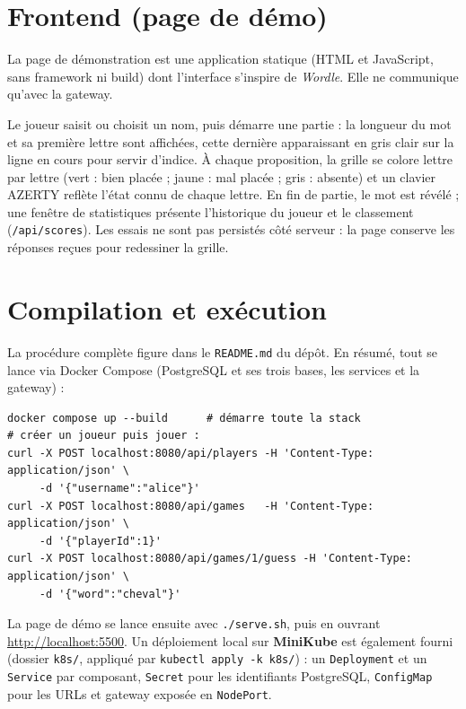\documentclass[11pt,a4paper]{article}
\begin{document}
\section{Frontend (page de démo)}
La page de démonstration est une application statique (HTML et JavaScript, sans
framework ni build) dont l'interface s'inspire de \textit{Wordle}. Elle ne communique
qu'avec la gateway.

Le joueur saisit ou choisit un nom, puis démarre une partie : la longueur du mot et sa
première lettre sont affichées, cette dernière apparaissant en gris clair sur la ligne
en cours pour servir d'indice. À chaque proposition, la grille se colore lettre par
lettre (vert : bien placée ; jaune : mal placée ; gris : absente) et un clavier AZERTY
reflète l'état connu de chaque lettre. En fin de partie, le mot est révélé ; une fenêtre
de statistiques présente l'historique du joueur et le classement (\texttt{/api/scores}).
Les essais ne sont pas persistés côté serveur : la page conserve les réponses reçues
pour redessiner la grille.


\section{Compilation et exécution}
La procédure complète figure dans le \texttt{README.md} du dépôt. En résumé, tout se
lance via Docker Compose (PostgreSQL et ses trois bases, les services et la gateway) :

\small
\begin{verbatim}
docker compose up --build      # démarre toute la stack
# créer un joueur puis jouer :
curl -X POST localhost:8080/api/players -H 'Content-Type: application/json' \
     -d '{"username":"alice"}'
curl -X POST localhost:8080/api/games   -H 'Content-Type: application/json' \
     -d '{"playerId":1}'
curl -X POST localhost:8080/api/games/1/guess -H 'Content-Type: application/json' \
     -d '{"word":"cheval"}'
\end{verbatim}
\normalsize
La page de démo se lance ensuite avec \texttt{./serve.sh}, puis en ouvrant
\url{http://localhost:5500}. Un déploiement local sur \textbf{MiniKube} est également
fourni (dossier \texttt{k8s/}, appliqué par \texttt{kubectl apply -k k8s/}) : un
\texttt{Deployment} et un \texttt{Service} par composant, \texttt{Secret} pour les
identifiants PostgreSQL, \texttt{ConfigMap} pour les URLs et gateway exposée en \texttt{NodePort}.
\end{document}
